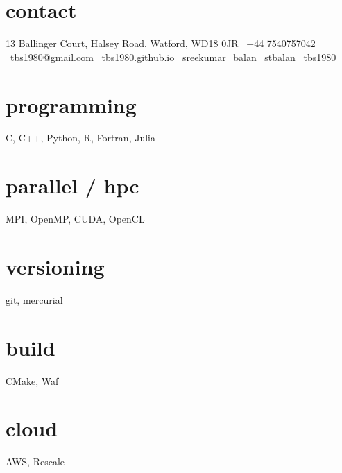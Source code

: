 \documentclass[]{friggeri-cv}
\def\twitter{{\FA \faTwitter}}
\def\email{{\FA \faEnvelope}}
\def\linkedin{{\FA \faLinkedinSign}}
\def\homepage{{\FA \faHome}}
\def\github{{\FA \faGithub}}
\def\telephone{{\FA \faPhone}}
\begin{document}

    \begin{aside}%
        \section{contact}
            13 Ballinger Court,
            Halsey Road,
            Watford, WD18 0JR
            \telephone\ +44 7540757042
            ~
            \href{mailto:tbs1980@gmail.com}{\email\ tbs1980@gmail.com}
            \href{http://tbs1980.github.io}{\homepage\ tbs1980.github.io}
            \href{https://twitter.com/sreekumar_balan}{\twitter\ sreekumar\_balan}
            \href{https://uk.linkedin.com/in/stbalan}{\linkedin\ stbalan}
            \href{https://github.com/tbs1980}{\github\ tbs1980}
        \section{programming}
            C, C++,
            Python, R,
            Fortran, Julia
        \section{parallel / hpc}
            MPI, OpenMP,
            CUDA, OpenCL
        \section{versioning}
            git, mercurial
        \section{build}
            CMake, Waf
        \section{cloud}
            AWS, Rescale
    \end{aside}
\end{document}
